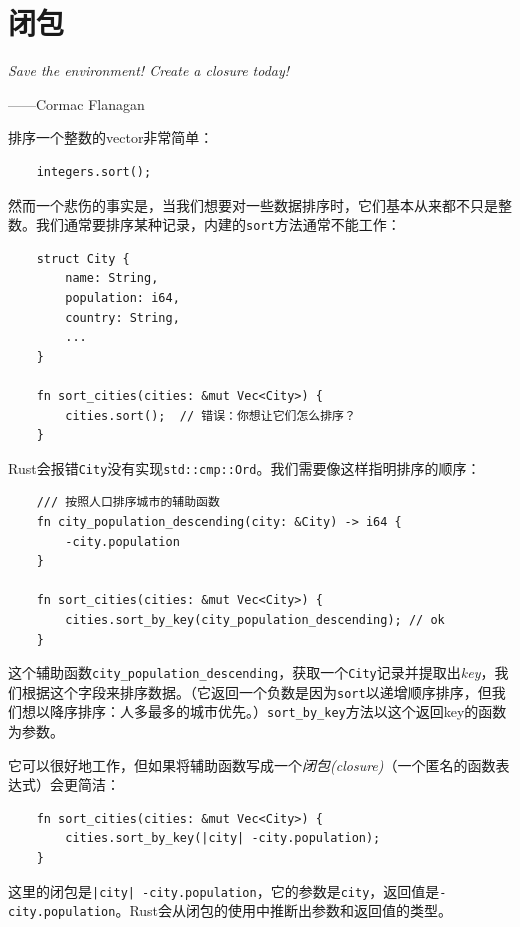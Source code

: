 \chapter{闭包}\label{ch14}

\emph{Save the environment! Create a closure today!}

\begin{flushright}
    ——Cormac Flanagan
\end{flushright}

排序一个整数的vector非常简单：
\begin{verbatim}
    integers.sort();
\end{verbatim}

然而一个悲伤的事实是，当我们想要对一些数据排序时，它们基本从来都不只是整数。我们通常要排序某种记录，内建的\texttt{sort}方法通常不能工作：
\begin{verbatim}
    struct City {
        name: String,
        population: i64,
        country: String,
        ...
    }

    fn sort_cities(cities: &mut Vec<City>) {
        cities.sort();  // 错误：你想让它们怎么排序？
    }
\end{verbatim}

Rust会报错\texttt{City}没有实现\texttt{std::cmp::Ord}。我们需要像这样指明排序的顺序：
\begin{verbatim}
    /// 按照人口排序城市的辅助函数
    fn city_population_descending(city: &City) -> i64 {
        -city.population
    }

    fn sort_cities(cities: &mut Vec<City>) {
        cities.sort_by_key(city_population_descending); // ok
    }
\end{verbatim}

这个辅助函数\texttt{city\_population\_descending}，获取一个\texttt{City}记录并提取出\emph{key}，我们根据这个字段来排序数据。（它返回一个负数是因为\texttt{sort}以递增顺序排序，但我们想以降序排序：人多最多的城市优先。）\texttt{sort\_by\_key}方法以这个返回key的函数为参数。

它可以很好地工作，但如果将辅助函数写成一个\emph{闭包(closure)}（一个匿名的函数表达式）会更简洁：
\begin{verbatim}
    fn sort_cities(cities: &mut Vec<City>) {
        cities.sort_by_key(|city| -city.population);
    }
\end{verbatim}

这里的闭包是\texttt{|city| -city.population}，它的参数是\texttt{city}，返回值是\texttt{-city.population}。Rust会从闭包的使用中推断出参数和返回值的类型。


